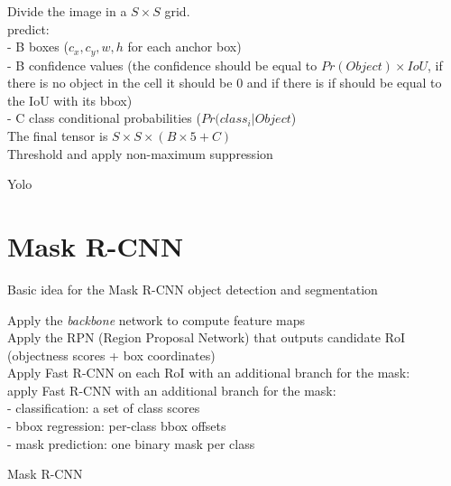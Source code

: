 \begin{algorithm}[H]
\DontPrintSemicolon
{}
 Divide the image in a $S\times S$ grid. \\
  { predict: \\
  - B boxes ($c_x, c_y, w, h$ for each anchor box) \\
  - B confidence values (the confidence should be equal to $Pr(Object) \times IoU$, if there is no object in the cell it should be 0 and if there is if should be equal to the IoU with its bbox) \\
  - C class conditional probabilities ($Pr(class_i|Object$) \\}
 The final tensor is $S\times S \times (B \times 5 + C)$ \\
 Threshold and apply non-maximum suppression
\caption{Yolo}
\end{algorithm}


\section{Mask R-CNN}
Basic idea for the Mask R-CNN object detection and segmentation

\begin{algorithm}[H]
\DontPrintSemicolon
{}
 Apply the \textit{backbone} network to compute feature maps \\
 Apply the RPN (Region Proposal Network) that outputs candidate RoI (objectness scores + box coordinates) \\
 Apply Fast R-CNN on each RoI with an additional branch for the mask:\\
 {
  apply Fast R-CNN with an additional branch for the mask: \\
 - classification: a set of class scores  \\
 - bbox regression: per-class bbox offsets \\
 - mask prediction: one binary mask per class 
 }
 \caption{Mask R-CNN}
\end{algorithm}

